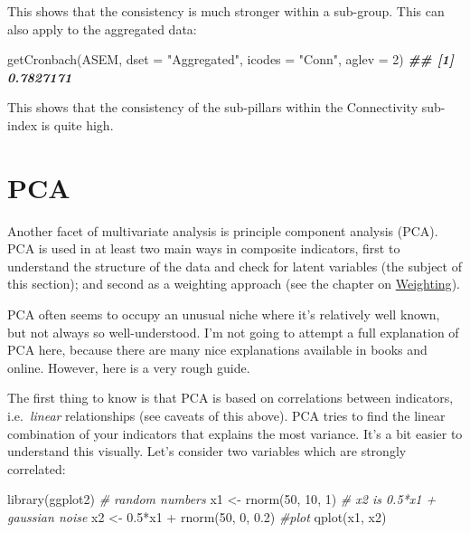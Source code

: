 \documentclass[
]{book}
\newenvironment{Shaded}{\begin{snugshade}}{\end{snugshade}}
\newcommand{\AttributeTok}[1]{\textcolor[rgb]{0.77,0.63,0.00}{#1}}
\newcommand{\CommentTok}[1]{\textcolor[rgb]{0.56,0.35,0.01}{\textit{#1}}}
\newcommand{\DecValTok}[1]{\textcolor[rgb]{0.00,0.00,0.81}{#1}}
\newcommand{\DocumentationTok}[1]{\textcolor[rgb]{0.56,0.35,0.01}{\textbf{\textit{#1}}}}
\newcommand{\FloatTok}[1]{\textcolor[rgb]{0.00,0.00,0.81}{#1}}
\newcommand{\FunctionTok}[1]{\textcolor[rgb]{0.00,0.00,0.00}{#1}}
\newcommand{\NormalTok}[1]{#1}
\newcommand{\OtherTok}[1]{\textcolor[rgb]{0.56,0.35,0.01}{#1}}
\newcommand{\SpecialCharTok}[1]{\textcolor[rgb]{0.00,0.00,0.00}{#1}}
\newcommand{\StringTok}[1]{\textcolor[rgb]{0.31,0.60,0.02}{#1}}
\begin{document}
This shows that the consistency is much stronger within a sub-group. This can also apply to the aggregated data:

\begin{Shaded}
\begin{Highlighting}[]
\FunctionTok{getCronbach}\NormalTok{(ASEM, }\AttributeTok{dset =} \StringTok{"Aggregated"}\NormalTok{, }\AttributeTok{icodes =} \StringTok{"Conn"}\NormalTok{, }\AttributeTok{aglev =} \DecValTok{2}\NormalTok{)}
\DocumentationTok{\#\# [1] 0.7827171}
\end{Highlighting}
\end{Shaded}

This shows that the consistency of the sub-pillars within the Connectivity sub-index is quite high.

\hypertarget{pca}{%
\section{PCA}\label{pca}}

Another facet of multivariate analysis is principle component analysis (PCA). PCA is used in at least two main ways in composite indicators, first to understand the structure of the data and check for latent variables (the subject of this section); and second as a weighting approach (see the chapter on \protect\hyperlink{weighting-2}{Weighting}).

PCA often seems to occupy an unusual niche where it's relatively well known, but not always so well-understood. I'm not going to attempt a full explanation of PCA here, because there are many nice explanations available in books and online. However, here is a very rough guide.

The first thing to know is that PCA is based on correlations between indicators, i.e.~\emph{linear} relationships (see caveats of this above). PCA tries to find the linear combination of your indicators that explains the most variance. It's a bit easier to understand this visually. Let's consider two variables which are strongly correlated:

\begin{Shaded}
\begin{Highlighting}[]
\FunctionTok{library}\NormalTok{(ggplot2)}
\CommentTok{\# random numbers}
\NormalTok{x1 }\OtherTok{\textless{}{-}} \FunctionTok{rnorm}\NormalTok{(}\DecValTok{50}\NormalTok{, }\DecValTok{10}\NormalTok{, }\DecValTok{1}\NormalTok{)}
\CommentTok{\# x2 is 0.5*x1 + gaussian noise}
\NormalTok{x2 }\OtherTok{\textless{}{-}} \FloatTok{0.5}\SpecialCharTok{*}\NormalTok{x1 }\SpecialCharTok{+} \FunctionTok{rnorm}\NormalTok{(}\DecValTok{50}\NormalTok{, }\DecValTok{0}\NormalTok{, }\FloatTok{0.2}\NormalTok{)}
\CommentTok{\#plot}
\FunctionTok{qplot}\NormalTok{(x1, x2)}
\end{Highlighting}
\end{Shaded}
\end{document}
